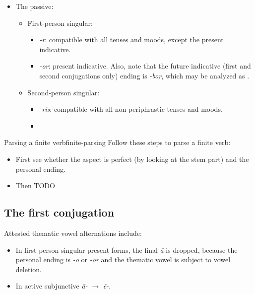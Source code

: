 \documentclass[a4paper, oneside, 12pt]{report}
\newcommand{\form}[1]{\emph{#1}}
\begin{document}
\begin{itemize}
    \item The passive:
    \begin{itemize}
        \item First-person singular: 
        \begin{itemize}
            \item \form{-r}: compatible with all tenses and moods, except the present indicative.
            \item \form{-or}: present indicative.
            Also, note that the future indicative (first and second conjugations only) ending is \form{-bor},
            which may be analyzed as .
        \end{itemize}
        \item Second-person singular:
        \begin{itemize}
            \item \form{-ris}: compatible with all non-periphrastic tenses and moods.
            \item
        \end{itemize}
    \end{itemize}
\end{itemize}

\begin{infobox}{Parsing a finite verb}{finite-parsing}
    Follow these steps to parse a finite verb:
    \begin{itemize}
        \item First see whether the aspect is perfect (by looking at the stem part)
            and the personal ending.
        \item Then TODO 
    \end{itemize}
\end{infobox}

\subsection{The first conjugation}\label{sec:verb-morphology.1c}

Attested thematic vowel alternations include:
\begin{itemize}
    \item In first person singular present forms, 
    the final \form{\={a}} is dropped, 
    because the personal ending is \form{-\={o}} or \form{-or}
    and the thematic vowel is subject to vowel deletion.
    \item In active subjunctive  \form{\={a}-} $\to$ \form{\={e}-}.
\end{itemize}
\end{document}
